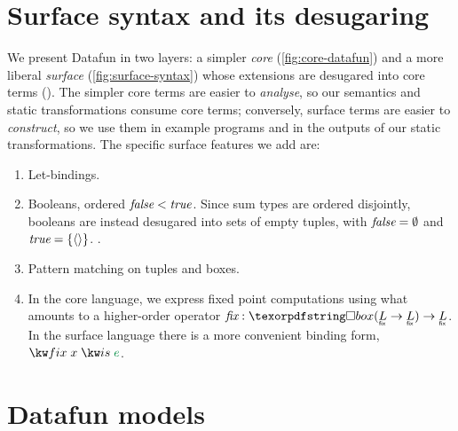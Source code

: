 \section{Surface syntax and its desugaring}
\label{sec:syntax}

We present Datafun in two layers: a simpler \emph{core}
(\cref{fig:core-datafun}) and a more liberal \emph{surface}
(\cref{fig:surface-syntax}) whose extensions are desugared into core terms
().
%
The simpler core terms are easier to \emph{analyse}, so our semantics and static
transformations consume core terms; conversely, surface terms are easier to
\emph{construct}, so we use them in example programs and in the outputs of our
static transformations.
%
The specific surface features we add are:

\nopagebreak[2]
\begin{enumerate}
\item Let-bindings.

\item Booleans, ordered $\text{\itshape false} < \text{\itshape true}$. Since sum types are ordered
  disjointly, booleans are instead desugared into sets of empty tuples, with
  $\text{\itshape false} = \emptyset$ and $\text{\itshape true} = \{{\langle{}\rangle}\}$. .

\item Pattern matching on tuples and boxes. 


\item In the core language, we express fixed point computations using what
  amounts to a higher-order operator $\prim{fix} : \iso{(\fixt L \to \fixt L)}
  \to \fixt L$. In the surface language there is a more convenient binding form,
  $\efixisd x e$.

\end{enumerate}


\section{Datafun models}
\label{sec:datafun-models}

